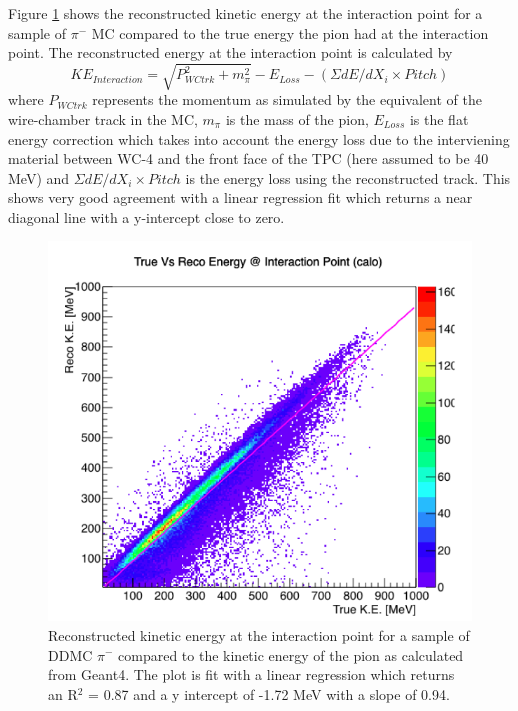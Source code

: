 Figure \ref{fig:RecoEvsTrueE} shows the reconstructed kinetic energy at the interaction point for a sample of $\pi^{-}$ MC compared to the true energy the pion had at the interaction point. The reconstructed energy at the interaction point is calculated by
\begin{equation}
KE_{Interaction} = \sqrt{P_{WCtrk}^2 + m_{\pi}^2} - E_{Loss} - (\Sigma dE/dX_{i} \times Pitch)
\end{equation}
where $P_{WCtrk}$ represents the momentum as simulated by the equivalent of the wire-chamber track in the MC, $m_{\pi}$ is the mass of the pion, $E_{Loss}$ is the flat energy correction which takes into account the energy loss due to the interviening material between WC-4 and the front face of the TPC (here assumed to be 40 MeV) and $\Sigma dE/dX_{i} \times Pitch$ is the energy loss using the reconstructed track. This shows very good agreement with a linear regression fit which returns a near diagonal line with a y-intercept close to zero.

\begin{figure}[htb]
\centering
\includegraphics[scale=0.38]{./images/RecoEvsTrueE.png}
\caption{Reconstructed kinetic energy at the interaction point for a sample of DDMC $\pi^{-}$ compared to the kinetic energy of the pion as calculated from Geant4. The plot is fit with a linear regression which returns an R$^{2}$ = 0.87 and a y intercept of -1.72 MeV with a slope of 0.94.}
\label{fig:RecoEvsTrueE}
\end{figure}

